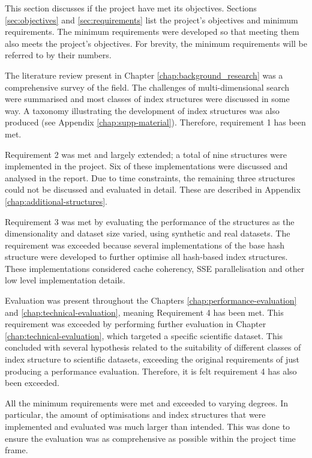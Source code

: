 This section discusses if the project have met its objectives. Sections \ref{sec:objectives} and \ref{sec:requirements} list the project's objectives and minimum requirements. The minimum requirements were developed so that meeting them also meets the project's objectives. For brevity, the minimum requirements will be referred to by their numbers.

The literature review present in Chapter \ref{chap:background_research} was a comprehensive survey of the field. The challenges of multi-dimensional search were summarised and most classes of index structures were discussed in some way. A taxonomy illustrating the development of index structures was also produced (see Appendix \ref{chap:supp-material}). Therefore, requirement 1 has been met.

Requirement 2 was met and largely extended; a total of nine structures were implemented in the project. Six of these implementations were discussed and analysed in the report. Due to time constraints, the remaining three structures could not be discussed and evaluated in detail. These are described in Appendix \ref{chap:additional-structures}. 

Requirement 3 was met by evaluating the performance of the structures as the dimensionality and dataset size varied, using synthetic and real datasets. The requirement was exceeded because several implementations of the base hash structure were developed to further optimise all hash-based index structures. These implementations considered cache coherency, SSE parallelisation and other low level implementation details. 

Evaluation was present throughout the Chapters \ref{chap:performance-evaluation} and \ref{chap:technical-evaluation}, meaning Requirement 4 has been met. This requirement was exceeded by performing further evaluation in Chapter \ref{chap:technical-evaluation}, which targeted a specific scientific dataset. This concluded with several hypothesis related to the suitability of different classes of index structure to scientific datasets, exceeding the original requirements of just producing a performance evaluation. Therefore, it is felt requirement 4 has also been exceeded.

All the minimum requirements were met and exceeded to varying degrees. In particular, the amount of optimisations and index structures that were implemented and evaluated was much larger than intended. This was done to ensure the evaluation was as comprehensive as possible within the project time frame.

